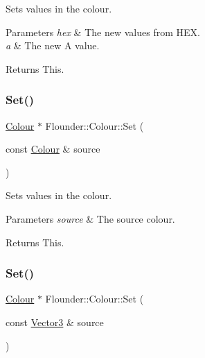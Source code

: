 Sets values in the colour. 


\begin{DoxyParams}{Parameters}
{\em hex} & The new values from H\+EX. \\
\hline
{\em a} & The new A value. \\
\hline
\end{DoxyParams}
\begin{DoxyReturn}{Returns}
This. 
\end{DoxyReturn}
\mbox{\label{class_flounder_1_1_colour_a79666b8c2792951d96a244bb81917fb2}} 
\subsubsection{\texorpdfstring{Set()}{Set()}\hspace{0.1cm}{\footnotesize\ttfamily [3/5]}}
{\footnotesize\ttfamily \hyperlink{class_flounder_1_1_colour}{Colour} $\ast$ Flounder\+::\+Colour\+::\+Set (\begin{DoxyParamCaption}\item[{const \hyperlink{class_flounder_1_1_colour}{Colour} \&}]{source }\end{DoxyParamCaption})}



Sets values in the colour. 


\begin{DoxyParams}{Parameters}
{\em source} & The source colour. \\
\hline
\end{DoxyParams}
\begin{DoxyReturn}{Returns}
This. 
\end{DoxyReturn}
\mbox{\label{class_flounder_1_1_colour_a94933bab6cb6128f207472ec0554aeeb}} 
\subsubsection{\texorpdfstring{Set()}{Set()}\hspace{0.1cm}{\footnotesize\ttfamily [4/5]}}
{\footnotesize\ttfamily \hyperlink{class_flounder_1_1_colour}{Colour} $\ast$ Flounder\+::\+Colour\+::\+Set (\begin{DoxyParamCaption}\item[{const \hyperlink{class_flounder_1_1_vector3}{Vector3} \&}]{source }\end{DoxyParamCaption})}



